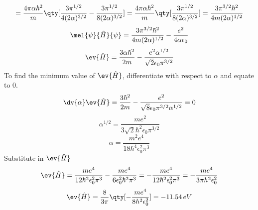 \[=\frac{4\pi\alpha\hbar^2}{m}\qty[\frac{3\pi^{1/2}}{4(2\alpha)^{3/2}}-\frac{3\pi^{1/2}}{8(2\alpha)^{3/2}}]=\frac{4\pi\alpha\hbar^2}{m}\qty[\frac{3\pi^{1/2}}{8(2\alpha)^{3/2}}]=\frac{3\pi^{3/2}\hbar^2}{4m(2\alpha)^{1/2}}\]
\[\mel{\psi}{\hat{H}}{\psi}=\frac{3\pi^{3/2}\hbar^2}{4m(2\alpha)^{1/2}}-\frac{e^2}{4\alpha\epsilon_0}\]
\[\ev{\hat{H}}=\frac{3\alpha\hbar^2}{2m}-\frac{e^2\alpha^{1/2}}{\sqrt{2}\epsilon_0\pi^{3/2}}\]
To find the minimum value of $\ev{\hat{H}}$, differentiate with respect to $\alpha$ and equate to $0$.
\[\dv{\alpha}\ev{\hat{H}}=\frac{3\hbar^2}{2m}-\frac{e^2}{\sqrt{8}\epsilon_0\pi^{3/2}\alpha^{1/2}}=0\]
\[\alpha^{1/2}=\frac{me^2}{3\sqrt{2}\hbar^2\epsilon_0\pi^{3/2}}\]
\[\alpha=\frac{m^2e^4}{18\hbar^4\epsilon_0^2\pi^{3}}\]
Substitute in $\ev{\hat{H}}$
\[\ev{\hat{H}}=\frac{me^4}{12\hbar^2\epsilon_0^2\pi^{3}}-\frac{me^4}{6\epsilon_0^2\hbar^2\pi^{3}}=-\frac{me^4}{12\hbar^2\epsilon_0^2\pi^{3}}=-\frac{me^4}{3\pi h^2\epsilon_0^2}\]
\[\ev{\hat{H}}=\frac{8}{3\pi}\qty[-\frac{me^4}{8h^2\epsilon_0^2}]=-11.54\,eV\]
